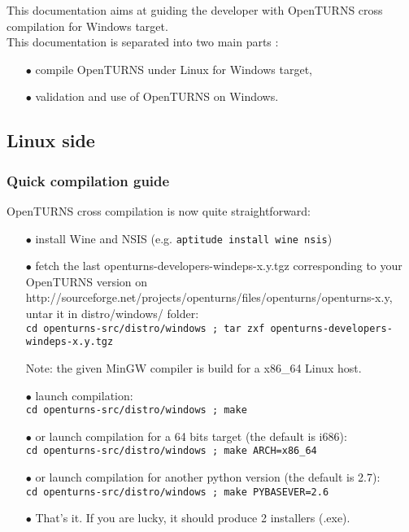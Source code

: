 
This documentation aims at guiding the developer with OpenTURNS cross compilation for Windows target.\\

This documentation is separated into two main parts :
\begin{itemize}
\item[$\bullet$]  compile OpenTURNS under Linux for Windows target,
\item[$\bullet$]  validation and use of OpenTURNS on Windows.
\end{itemize}

\subsection{Linux side}

\subsubsection{Quick compilation guide}

OpenTURNS cross compilation is now quite straightforward:

\begin{itemize}
\item[$\bullet$] install Wine and NSIS (e.g. \verb|aptitude install wine nsis|)
\item[$\bullet$] fetch the last openturns-developers-windeps-x.y.tgz corresponding to your OpenTURNS version on http://sourceforge.net/projects/openturns/files/openturns/openturns-x.y, untar it in distro/windows/ folder:\\
\verb|cd openturns-src/distro/windows ; tar zxf openturns-developers-windeps-x.y.tgz|

Note: the given MinGW compiler is build for a x86\_64 Linux host.
\item[$\bullet$] launch compilation:\\
\verb|cd openturns-src/distro/windows ; make|

\item[$\bullet$] or launch compilation for a 64 bits target (the default is i686):\\
\verb|cd openturns-src/distro/windows ; make ARCH=x86_64|

\item[$\bullet$] or launch compilation for another python version (the default is 2.7):\\
\verb|cd openturns-src/distro/windows ; make PYBASEVER=2.6|

\item[$\bullet$] That's it. If you are lucky, it should produce 2 installers (.exe).\\
\end{itemize}

